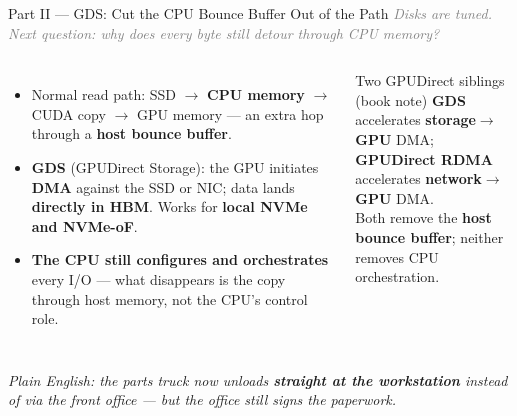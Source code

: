 \documentclass[aspectratio=169]{beamer}
\newcommand{\kw}[1]{\textbf{\textcolor{kwblue}{#1}}}
\newcommand{\pe}[1]{\par{\setlength{\fboxsep}{2.5pt}\noindent\colorbox{navy!9}{\parbox{\dimexpr\textwidth-5pt\relax}{\footnotesize\itshape Plain English: #1}}}}
\newcommand{\bridge}[1]{{\footnotesize\itshape\textcolor{gray}{#1}}\par}
\begin{document}
\begin{frame}{Part II --- GDS: Cut the CPU Bounce Buffer Out of the Path}
  \bridge{Disks are tuned. Next question: why does every byte still detour through CPU memory?}
  \begin{columns}[c]
    \begin{itemize}
      \item Normal read path: SSD $\to$ \kw{CPU memory} $\to$ CUDA copy $\to$ GPU memory ---
            an extra hop through a \kw{host bounce buffer}.
      \item \kw{GDS} (GPUDirect Storage): the GPU initiates \kw{DMA} against the SSD or NIC;
            data lands \kw{directly in HBM}. Works for \kw{local NVMe and NVMe-oF}.
      \item \kw{The CPU still configures and orchestrates} every I/O --- what disappears is
            the copy through host memory, not the CPU's control role.
    \end{itemize}
    \begin{block}{Two GPUDirect siblings (book note)}
      \small \kw{GDS} accelerates \kw{storage$\to$GPU} DMA;\\
      \kw{GPUDirect RDMA} accelerates \kw{network$\to$GPU} DMA.\\[2pt]
      Both remove the \kw{host bounce buffer}; neither removes CPU orchestration.
    \end{block}
  \end{columns}
  \pe{the parts truck now unloads \kw{straight at the workstation} instead of via the front office --- but the office still signs the paperwork.}
\end{frame}
\end{document}
